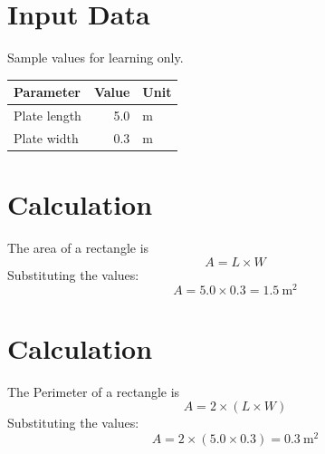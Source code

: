 \documentclass{article}
\begin{document}
\section{Input Data}
Sample values for learning only.

\begin{tabular}{|l|r|l|}
\hline
Parameter & Value & Unit \\
\hline
Plate length & 5.0 & m \\
Plate width & 0.3 & m \\
\hline
\end{tabular}

\section{Calculation}
The area of a rectangle is
\begin{equation}
A = L \times W
\end{equation}
Substituting the values:
\[
A = 5.0 \times 0.3 = 1.5 \ \mathrm{m^2}
\]


\section{Calculation}
The Perimeter of a rectangle is
\begin{equation}
A = 2 \times (L \times W)
\end{equation}
Substituting the values:
\[
A = 2 \times (5.0 \times 0.3) = 0.3 \ \mathrm{m^2}
\]
\end{document}
